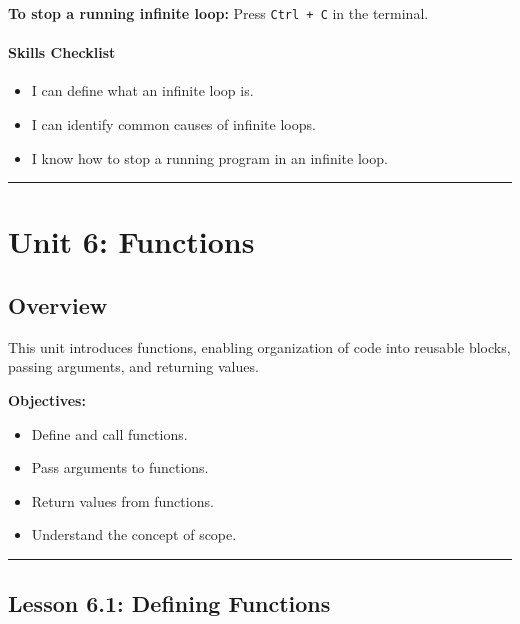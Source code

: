 \documentclass[
  justified,
  openright,
]{tufte-book}
\let\subsubsection\paragraph
\let\paragraph\paragraph
\let\subsubsection\paragraph
\let\paragraph\paragraph
\providecommand{\tightlist}{%
  \setlength{\itemsep}{0pt}\setlength{\parskip}{0pt}}
\begin{document}
\textbf{To stop a running infinite loop:} Press \texttt{Ctrl\ +\ C} in
the terminal.

\subsubsection{Skills Checklist}\label{skills-checklist-26}

\begin{itemize}
\tightlist
\item[$\square$]
  I can define what an infinite loop is.
\item[$\square$]
  I can identify common causes of infinite loops.
\item[$\square$]
  I know how to stop a running program in an infinite loop.
\end{itemize}

\begin{center}\rule{0.5\linewidth}{0.5pt}\end{center}

\section{Unit 6: Functions}\label{unit-6-functions-1}

\subsection{Overview}\label{overview-6}

This unit introduces functions, enabling organization of code into
reusable blocks, passing arguments, and returning values.

\textbf{Objectives:}

\begin{itemize}
\tightlist
\item
  Define and call functions.
\item
  Pass arguments to functions.
\item
  Return values from functions.
\item
  Understand the concept of scope.
\end{itemize}

\begin{center}\rule{0.5\linewidth}{0.5pt}\end{center}

\subsection{Lesson 6.1: Defining
Functions}\label{lesson-6.1-defining-functions}
\end{document}

